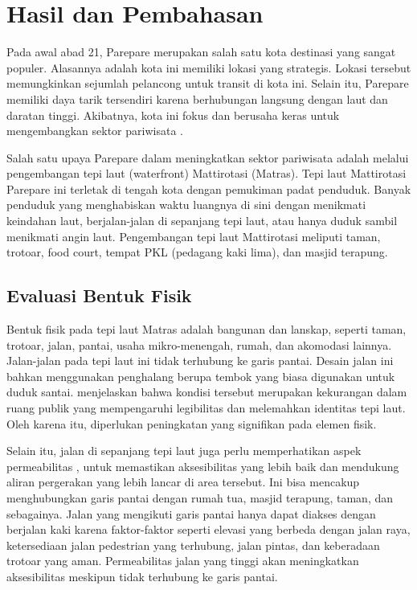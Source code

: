 \documentclass[11pt]{simart} %
\begin{document}

\section{Hasil dan Pembahasan}%

Pada awal abad 21, Parepare merupakan salah satu kota destinasi yang sangat populer. Alasannya adalah kota ini memiliki lokasi yang strategis. Lokasi tersebut memungkinkan sejumlah pelancong untuk transit di kota ini. Selain itu, Parepare memiliki daya tarik tersendiri karena berhubungan langsung dengan laut dan daratan tinggi. Akibatnya, kota ini fokus dan berusaha keras untuk mengembangkan sektor pariwisata \citep{faniapriani2018}.

Salah satu upaya Parepare dalam meningkatkan sektor pariwisata adalah melalui pengembangan tepi laut (waterfront) Mattirotasi (Matras). Tepi laut Mattirotasi Parepare ini terletak di tengah kota dengan pemukiman padat penduduk. Banyak penduduk yang menghabiskan waktu luangnya di sini dengan menikmati keindahan laut, berjalan-jalan di sepanjang tepi laut, atau hanya duduk sambil menikmati angin laut. Pengembangan tepi laut Mattirotasi meliputi taman, trotoar, food court, tempat PKL (pedagang kaki lima), dan masjid terapung.

\subsection{Evaluasi Bentuk Fisik}%
\label{sub:Evaluasi Bentuk Fisik}

Bentuk fisik pada tepi laut Matras adalah bangunan dan lanskap, seperti taman, trotoar, jalan, pantai, usaha mikro-menengah, rumah, dan akomodasi lainnya.
Jalan-jalan pada tepi laut ini tidak terhubung ke garis pantai.
Desain jalan ini bahkan menggunakan penghalang berupa tembok yang biasa digunakan untuk duduk santai.
\cite{iqbal2020} menjelaskan bahwa kondisi tersebut merupakan kekurangan dalam ruang publik yang mempengaruhi legibilitas dan melemahkan identitas tepi laut.
Oleh karena itu, diperlukan peningkatan yang signifikan pada elemen fisik.

Selain itu, jalan di sepanjang tepi laut juga perlu memperhatikan aspek permeabilitas \citep{wanismail2018}, untuk memastikan aksesibilitas yang lebih baik dan mendukung aliran pergerakan yang lebih lancar di area tersebut.
Ini bisa mencakup menghubungkan garis pantai dengan rumah tua, masjid terapung, taman, dan sebagainya.
Jalan yang mengikuti garis pantai hanya dapat diakses dengan berjalan kaki karena faktor-faktor seperti elevasi yang berbeda dengan jalan raya, ketersediaan jalan pedestrian yang terhubung, jalan pintas, dan keberadaan trotoar yang aman.
Permeabilitas jalan yang tinggi akan meningkatkan aksesibilitas meskipun tidak terhubung ke garis pantai.
\end{document}
